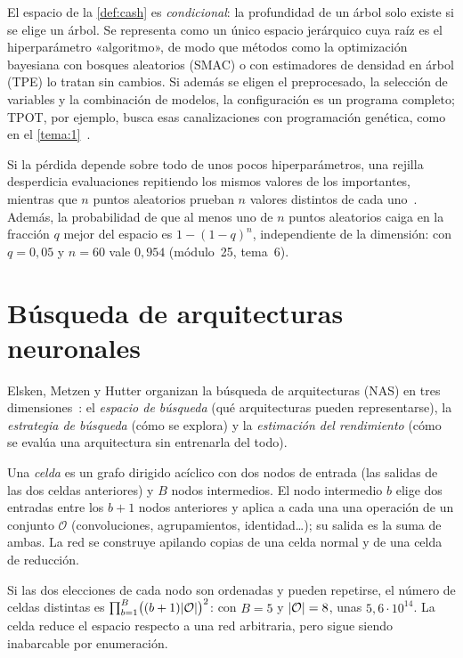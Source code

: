 El espacio de la \cref{def:cash} es \emph{condicional}: la profundidad de un árbol solo existe si se elige un árbol. Se representa como un único espacio jerárquico cuya raíz es el hiperparámetro «algoritmo», de modo que métodos como la optimización bayesiana con bosques aleatorios (SMAC) o con estimadores de densidad en árbol (TPE) lo tratan sin cambios. Si además se eligen el preprocesado, la selección de variables y la combinación de modelos, la configuración es un programa completo; TPOT, por ejemplo, busca esas canalizaciones con programación genética, como en el \cref{tema:1}~\cite{automl}.

\begin{observacion}\label{obs:aleatoria}
Si la pérdida depende sobre todo de unos pocos hiperparámetros, una rejilla desperdicia evaluaciones repitiendo los mismos valores de los importantes, mientras que $n$ puntos aleatorios prueban $n$ valores distintos de cada uno~\cite{bergstra}. Además, la probabilidad de que al menos uno de $n$ puntos aleatorios caiga en la fracción $q$ mejor del espacio es $1-(1-q)^{n}$, independiente de la dimensión: con $q=0{,}05$ y $n=60$ vale $0{,}954$ (módulo~25, tema~6).
\end{observacion}

\section{Búsqueda de arquitecturas neuronales}

Elsken, Metzen y Hutter organizan la búsqueda de arquitecturas (NAS) en tres dimensiones~\cite{elsken}: el \emph{espacio de búsqueda} (qué arquitecturas pueden representarse), la \emph{estrategia de búsqueda} (cómo se explora) y la \emph{estimación del rendimiento} (cómo se evalúa una arquitectura sin entrenarla del todo).

\begin{definicion}\label{def:celdas}
Una \emph{celda} es un grafo dirigido acíclico con dos nodos de entrada (las salidas de las dos celdas anteriores) y $B$ nodos intermedios. El nodo intermedio $b$ elige dos entradas entre los $b+1$ nodos anteriores y aplica a cada una una operación de un conjunto $\mathcal{O}$ (convoluciones, agrupamientos, identidad\dots); su salida es la suma de ambas. La red se construye apilando copias de una celda normal y de una celda de reducción.
\end{definicion}

Si las dos elecciones de cada nodo son ordenadas y pueden repetirse, el número de celdas distintas es $\prod_{b=1}^{B}\bigl((b+1)\lvert\mathcal{O}\rvert\bigr)^{2}$: con $B=5$ y $\lvert\mathcal{O}\rvert=8$, unas $5{,}6\cdot10^{14}$. La celda reduce el espacio respecto a una red arbitraria, pero sigue siendo inabarcable por enumeración.


